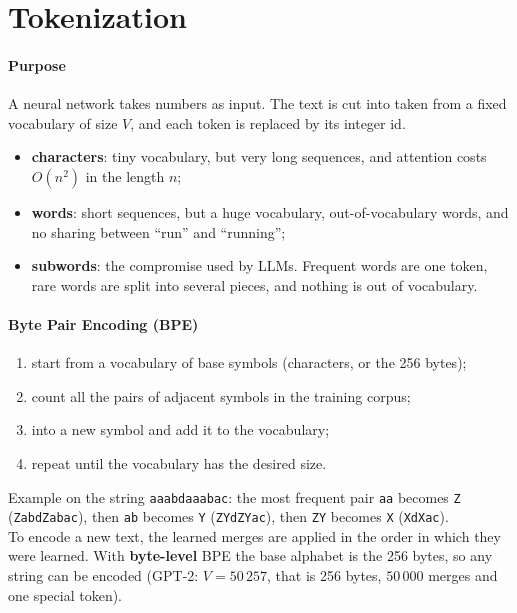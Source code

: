 \section{Tokenization}
\paragraph{Purpose}
A neural network takes numbers as input. The text is cut into  taken from a
fixed vocabulary of size $V$, and each token is replaced by its integer id.
\begin{itemize}
    \item \textbf{characters}: tiny vocabulary, but very long sequences, and attention costs
        $O(n^{2})$ in the length $n$;
    \item \textbf{words}: short sequences, but a huge vocabulary, out-of-vocabulary words,
        and no sharing between ``run'' and ``running'';
    \item \textbf{subwords}: the compromise used by LLMs. Frequent words are one token,
        rare words are split into several pieces, and nothing is out of vocabulary.
\end{itemize}

\paragraph{Byte Pair Encoding (BPE)}
\begin{enumerate}
    \item start from a vocabulary of base symbols (characters, or the 256 bytes);
    \item count all the pairs of adjacent symbols in the training corpus;
    \item {} into a new symbol and add it to the vocabulary;
    \item repeat until the vocabulary has the desired size.
\end{enumerate}
Example on the string \texttt{aaabdaaabac}: the most frequent pair \texttt{aa} becomes
\texttt{Z} (\texttt{ZabdZabac}), then \texttt{ab} becomes \texttt{Y} (\texttt{ZYdZYac}),
then \texttt{ZY} becomes \texttt{X} (\texttt{XdXac}).\\
To encode a new text, the learned merges are applied in the order in which they were
learned. With \textbf{byte-level} BPE the base alphabet is the 256 bytes, so any string
can be encoded (GPT-2: $V=50\,257$, that is 256 bytes, $50\,000$ merges and one special
token).

